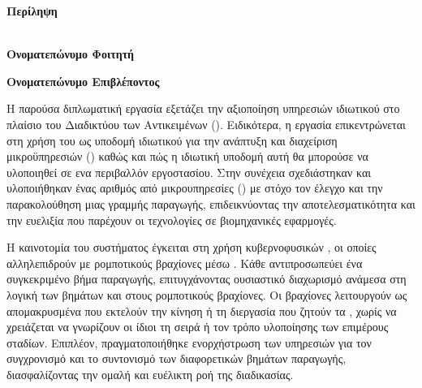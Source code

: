 \pagestyle{plain}
\begin{center}
  {\LARGE \textbf{Περίληψη}}\\[1cm]
  \textbf{\doctitle}\\[1cm]
  \begin{minipage}{0.38\textwidth}
    \begin{flushleft}
      \textbf{Ονοματεπώνυμο Φοιτητή}\\
      \textbf{\nommesmall}
    \end{flushleft}
  \end{minipage}
  \begin{minipage}{0.38\textwidth}
    \begin{flushright}
      \textbf{Ονοματεπώνυμο Επιβλέποντος}\\
      \textbf{\supname}
    \end{flushright}
  \end{minipage}
\end{center}

\vspace{10mm}

Η παρούσα διπλωματική εργασία εξετάζει την αξιοποίηση υπηρεσιών ιδιωτικού  στο πλαίσιο του
Διαδικτύου των Αντικειμένων (). Ειδικότερα, η εργασία επικεντρώνεται στη χρήση του 
ως υποδομή ιδιωτικού  για την ανάπτυξη και διαχείριση μικροϋπηρεσιών () καθώς
και πώς η ιδιωτική υποδομή αυτή θα μπορούσε να υλοποιηθεί σε ενα περιβαλλόν εργοστασίου. Στην συνέχεια
σχεδιάστηκαν και υλοποιήθηκαν ένας αριθμός από μικρουπηρεσίες () με στόχο τον έλεγχο και την παρακολούθηση
μιας γραμμής παραγωγής, επιδεικνύοντας την αποτελεσματικότητα και την ευελιξία που παρέχουν οι τεχνολογίες  σε
βιομηχανικές εφαρμογές.

Η καινοτομία του συστήματος έγκειται στη χρήση κυβερνοφυσικών , οι οποίες αλληλεπιδρούν με ρομποτικούς βραχίονες
μέσω . Κάθε  αντιπροσωπεύει ένα συγκεκριμένο βήμα παραγωγής, επιτυγχάνοντας ουσιαστικό διαχωρισμό 
ανάμεσα στη λογική των βημάτων και στους ρομποτικούς βραχίονες. Οι βραχίονες λειτουργούν ως απομακρυσμένα
 που εκτελούν την κίνηση ή τη διεργασία που ζητούν τα , χωρίς να χρειάζεται
να γνωρίζουν οι ίδιοι τη σειρά ή τον τρόπο υλοποίησης των επιμέρους σταδίων. Επιπλέον, πραγματοποιήθηκε ενορχήστρωση
των υπηρεσιών  για τον συγχρονισμό και το συντονισμό των διαφορετικών βημάτων παραγωγής,
διασφαλίζοντας την ομαλή και ευέλικτη ροή της διαδικασίας.

